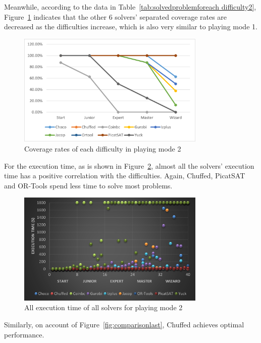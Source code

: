 Meanwhile, according to the data in Table~\ref{tab:solvedproblemforeach difficulty2}, Figure~\ref{fig:mode2eva4} indicates that the other 6 solvers' separated coverage rates are decreased as the difficulties increase, which is also very similar to playing mode 1.
 \begin{figure}[H]
   \centering
    \includegraphics[width=0.8\textwidth]{figs/mode2seperatedcoverage.png}
    \caption{Coverage rates of each difficulty in playing mode 2}
    \label{fig:mode2eva4}
\end{figure}
For the execution time, as is shown in Figure~\ref{fig:mode2time2}, almost all the solvers' execution time has a positive correlation with the difficulties. Again, Chuffed, PicatSAT and OR-Tools spend less time to solve most problems. 
\begin{figure}[H]
    \centering
    \includegraphics[width=0.8\textwidth]{figs/time2all.png}
    \caption{All execution time of all solvers for playing mode 2}
    \label{fig:mode2time2}
\end{figure}
Similarly, on account of Figure~\ref{fig:comparisonlast}, Chuffed achieves optimal performance. 
